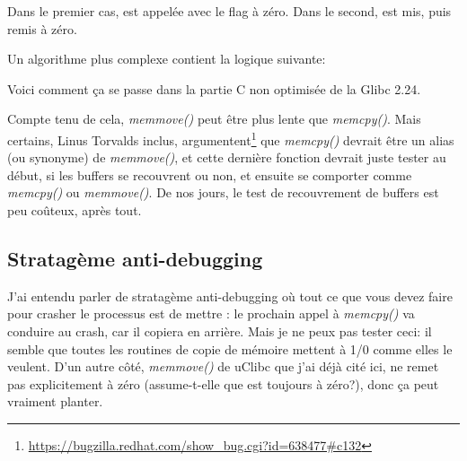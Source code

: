 Dans le premier cas,  est appelée avec le flag  à zéro.
Dans le second,  est mis, puis remis à zéro.

Un algorithme plus complexe contient la logique suivante:


Voici comment ça se passe dans la partie C non optimisée de la Glibc 2.24.

Compte tenu de cela, \emph{memmove()} peut être plus lente que \emph{memcpy()}.
Mais certains, Linus Torvalds inclus, argumentent\footnote{\url{https://bugzilla.redhat.com/show_bug.cgi?id=638477\#c132}}
que \emph{memcpy()} devrait être un alias (ou synonyme) de \emph{memmove()}, et cette
dernière fonction devrait juste tester au début, si les buffers se recouvrent ou
non, et ensuite se comporter comme \emph{memcpy()} ou \emph{memmove()}.
De nos jours, le test de recouvrement de buffers est peu coûteux, après tout.

\subsection{Stratagème anti-debugging}

J'ai entendu parler de stratagème anti-debugging où tout ce que vous devez faire pour
crasher le processus est de mettre : le prochain appel à \emph{memcpy()} va
conduire au crash, car il copiera en arrière.
Mais je ne peux pas tester ceci: il semble que toutes les routines de copie de mémoire
mettent  à 1/0 comme elles le veulent.
D'un autre côté, \emph{memmove()} de uClibc que j'ai déjà cité ici, ne remet pas explicitement
 à zéro (assume-t-elle que  est toujours à zéro?), donc ça peut vraiment
planter.

